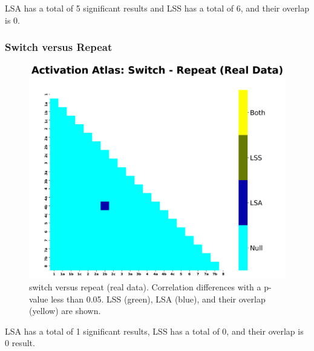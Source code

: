\documentclass[10pt,letterpaper]{article}
\begin{document}
LSA has a total of 5 significant results and LSS has a total of 6,
and their overlap is 0.

\subsubsection*{Switch versus Repeat}
\label{results:bsc-switchXrepeat}

\begin{figure}[H]
  \centering
  \includegraphics[width=\textwidth]{data-task_atlas-activation_contrast-switchXrepeat}
  \caption{
    switch versus repeat (real data). Correlation differences with a p-value less than 0.05.
    LSS (green), LSA (blue), and their overlap (yellow) are shown.
  }
  \label{fig:switchvrepeat}
\end{figure}

LSA has a total of 1 significant results, LSS has a total of 0,
and their overlap is 0 result.
\end{document}
